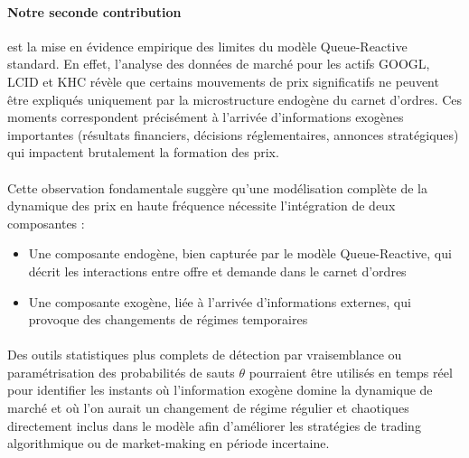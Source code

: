 \documentclass[12pt,a4paper]{article}
\theoremstyle{definition}
\theoremstyle{remark}
\begin{document}
\paragraph{\textbf{Notre seconde contribution}} est la mise en évidence empirique des limites du modèle Queue-Reactive standard. En effet, l'analyse des données de marché pour les actifs GOOGL, LCID et KHC révèle que certains mouvements de prix significatifs ne peuvent être expliqués uniquement par la microstructure endogène du carnet d'ordres. Ces moments correspondent précisément à l'arrivée d'informations exogènes importantes (résultats financiers, décisions réglementaires, annonces stratégiques) qui impactent brutalement la formation des prix.

\paragraph{} Cette observation fondamentale suggère qu'une modélisation complète de la dynamique des prix en haute fréquence nécessite l'intégration de deux composantes :
\begin{itemize}
    \item Une composante endogène, bien capturée par le modèle Queue-Reactive, qui décrit les interactions entre offre et demande dans le carnet d'ordres
    \item Une composante exogène, liée à l'arrivée d'informations externes, qui provoque des changements de régimes temporaires
\end{itemize}

\paragraph{}Des outils statistiques plus complets de détection par vraisemblance ou paramétrisation des probabilités de sauts $\theta$ pourraient être utilisés en temps réel pour identifier les instants où l'information exogène domine la dynamique de marché et où l'on aurait un changement de régime régulier et chaotiques directement inclus dans le modèle afin d'améliorer les stratégies de trading algorithmique ou de market-making en période incertaine.
\end{document}
